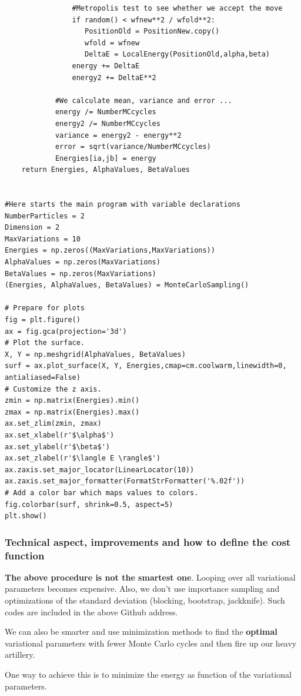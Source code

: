 \documentclass{beamer}
\begin{document}
\begin{frame}
\begin{verbatim}
                #Metropolis test to see whether we accept the move
                if random() < wfnew**2 / wfold**2:
                   PositionOld = PositionNew.copy()
                   wfold = wfnew
                   DeltaE = LocalEnergy(PositionOld,alpha,beta)
                energy += DeltaE
                energy2 += DeltaE**2

            #We calculate mean, variance and error ...
            energy /= NumberMCcycles
            energy2 /= NumberMCcycles
            variance = energy2 - energy**2
            error = sqrt(variance/NumberMCcycles)
            Energies[ia,jb] = energy    
    return Energies, AlphaValues, BetaValues


#Here starts the main program with variable declarations
NumberParticles = 2
Dimension = 2
MaxVariations = 10
Energies = np.zeros((MaxVariations,MaxVariations))
AlphaValues = np.zeros(MaxVariations)
BetaValues = np.zeros(MaxVariations)
(Energies, AlphaValues, BetaValues) = MonteCarloSampling()

# Prepare for plots
fig = plt.figure()
ax = fig.gca(projection='3d')
# Plot the surface.
X, Y = np.meshgrid(AlphaValues, BetaValues)
surf = ax.plot_surface(X, Y, Energies,cmap=cm.coolwarm,linewidth=0, antialiased=False)
# Customize the z axis.
zmin = np.matrix(Energies).min()
zmax = np.matrix(Energies).max()
ax.set_zlim(zmin, zmax)
ax.set_xlabel(r'$\alpha$')
ax.set_ylabel(r'$\beta$')
ax.set_zlabel(r'$\langle E \rangle$')
ax.zaxis.set_major_locator(LinearLocator(10))
ax.zaxis.set_major_formatter(FormatStrFormatter('%.02f'))
# Add a color bar which maps values to colors.
fig.colorbar(surf, shrink=0.5, aspect=5)
plt.show()

\end{verbatim}
\end{frame}

\begin{frame}
\frametitle{Technical aspect, improvements and how to define the cost function}

\begin{block}{}

\textbf{The above procedure is not the smartest one}. Looping over all variational parameters becomes expensive.
Also, we don't use importance sampling and optimizations of the standard deviation (blocking, bootstrap, jackknife). 
Such codes are included in the above Github address.


We can also be smarter and use minimization methods to find the \textbf{optimal} variational parameters with fewer Monte Carlo cycles and then 
fire up our heavy artillery. 

One way to achieve this is to minimize the energy as function of the variational parameters.

\end{block}
\end{frame}
\end{document}
